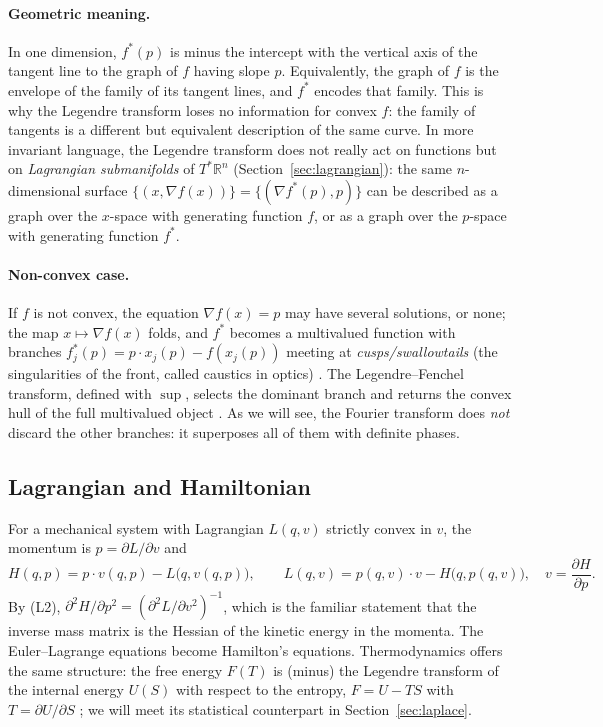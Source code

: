 \documentclass[11pt,a4paper]{article}
\newcommand{\R}{\mathbb{R}}
\theoremstyle{plain}
\theoremstyle{definition}
\theoremstyle{remark}
\begin{document}
\paragraph{Geometric meaning.}
In one dimension, $f^*(p)$ is minus the intercept with the vertical axis of the tangent line to the graph of $f$ having slope $p$. Equivalently, the graph of $f$ is the envelope of the family of its tangent lines, and $f^*$ encodes that family. This is why the Legendre transform loses no information for convex $f$: the family of tangents is a different but equivalent description of the same curve. In more invariant language, the Legendre transform does not really act on functions but on \emph{Lagrangian submanifolds} of $T^*\R^n$ (Section~\ref{sec:lagrangian}): the same $n$-dimensional surface $\{(x,\nabla f(x))\}=\{(\nabla f^*(p),p)\}$ can be described as a graph over the $x$-space with generating function $f$, or as a graph over the $p$-space with generating function $f^*$.

\paragraph{Non-convex case.}
If $f$ is not convex, the equation $\nabla f(x)=p$ may have several solutions, or none; the map $x\mapsto\nabla f(x)$ folds, and $f^*$ becomes a multivalued function with branches $f^*_j(p)=p\cdot x_j(p)-f(x_j(p))$ meeting at \emph{cusps/swallowtails} (the singularities of the front, called caustics in optics) \cite{Arnold,Duistermaat}. The Legendre--Fenchel transform, defined with $\sup$, selects the dominant branch and returns the convex hull of the full multivalued object \cite{Rockafellar,Touchette}. As we will see, the Fourier transform does \emph{not} discard the other branches: it superposes all of them with definite phases.

\subsection{Lagrangian and Hamiltonian}

For a mechanical system with Lagrangian $L(q,v)$ strictly convex in $v$, the momentum is $p=\partial L/\partial v$ and
\begin{equation}
H(q,p)=p\cdot v(q,p)-L\bigl(q,v(q,p)\bigr),\qquad L(q,v)=p(q,v)\cdot v-H\bigl(q,p(q,v)\bigr),\quad v=\frac{\partial H}{\partial p}.
\end{equation}
By (L2), $\partial^2H/\partial p^2=(\partial^2L/\partial v^2)^{-1}$, which is the familiar statement that the inverse mass matrix is the Hessian of the kinetic energy in the momenta. The Euler--Lagrange equations become Hamilton's equations. Thermodynamics offers the same structure: the free energy $F(T)$ is (minus) the Legendre transform of the internal energy $U(S)$ with respect to the entropy, $F=U-TS$ with $T=\partial U/\partial S$ \cite{Callen,Zia}; we will meet its statistical counterpart in Section~\ref{sec:laplace}.
\end{document}
